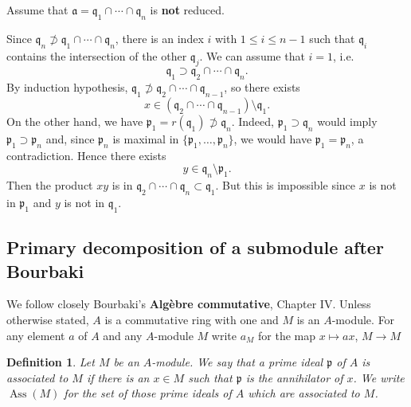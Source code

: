 \documentclass[parskip=half,fontsize=12pt]{scrartcl}%
\newcommand{\oo}{\operatorname}\newcommand{\ooo}{\operatorname*}
\newcommand{\mf}{\mathfrak}
\newcommand{\ppp}{\mf p}
\newcommand{\qqq}{\mf q}
\newcommand{\Ass}{\oo{Ass}}
\newtheorem{df}[thm]{Definition}
\begin{document}
Assume that $\mathfrak{a}=\mathfrak{q}_1\cap \cdots \cap \mathfrak{q}_n$ is \textbf{not} reduced. %

Since $\mathfrak{q}_n\not \supset \mathfrak{q}_1\cap \cdots \cap \mathfrak{q}_n$, there is an index $i$ with $1\leq i\leq n-1$ such that $\mathfrak{q}_i$ contains the intersection of the other $\qqq_j$. We can assume that $i=1$, i.e. 
$$
\mathfrak{q}_1\supset \mathfrak{q}_2\cap \cdots \cap\mathfrak{q}_n.
$$ 
By induction hypothesis, $\mathfrak{q}_1\not \supset \mathfrak{q}_2\cap \cdots \cap\mathfrak{q}_{n-1}$, so there exists 
$$
x\in(\mathfrak{q}_2\cap \cdots \cap\mathfrak{q}_{n-1})\setminus\mathfrak{q}_1.
$$ 
On the other hand, we have $\mathfrak{p}_1=r(\mathfrak{q}_1)\not \supset \mathfrak{q}_n$. Indeed, $\mathfrak{p}_1\supset \mathfrak{q}_n$ would imply $\mathfrak{p}_1\supset \mathfrak{p}_n$ and, since $\mathfrak{p}_n$ is maximal in $\{\mathfrak{p}_1,\dots,\mathfrak{p}_n\}$, we would have $\mathfrak{p}_1=\mathfrak{p}_n$, a contradiction. Hence there exists 
$$
y\in\mathfrak{q}_n\setminus\mathfrak{p}_1.
$$ 
Then the product $xy$ is in $\mathfrak{q}_2\cap \cdots \cap \mathfrak{q}_n\subset\mathfrak{q}_1$. But this is impossible since $x$ is not in $\ppp_1$ and $y$ is not in $\qqq_1$. %

\subsection{Primary decomposition of a submodule after Bourbaki}%


We follow closely Bourbaki's \textbf{Algèbre commutative}, Chapter IV. Unless otherwise stated, $A$ is a commutative ring with one and $M$ is an $A$-module. For any element $a$ of $A$ and any $A$-module $M$ write $a_M$ for the map $x\mapsto ax$, $M\to M$


\begin{df}
Let $M$ be an $A$-module. We say that a prime ideal $\ppp$ of $A$ is \emph{associated} to $M$ if there is an $x\in M$ such that  $\ppp$ is the annihilator of $x$. We write $\Ass(M)$ for the set of those prime ideals of $A$ which are associated to $M$. 
\end{df}
\end{document}

